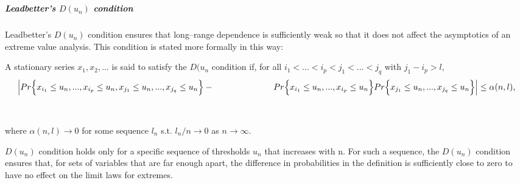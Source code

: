 \documentclass[usenames,dvipsnames]{beamer}
\begin{document}
\part{}
\begin{frame}[noframenumbering]
\frametitle{Leadbetter’s $D(u_{n})$ condition}
\scriptsize
Leadbetter’s $D(u_{n})$ condition ensures that long–range dependence is sufficiently weak so that it does not affect the asymptotics
of an extreme value analysis. This condition is stated more formally in this way:
\begin{definition}
A stationary series $x_{1}, x_{2}, ...$ is said to satisfy the $D(u_{n}$ condition if, for all $i_{1}<...< i_{p}<j_{1}<...<j_{q}$ with $j_{1}-i_{p}>l$, 
\begin{equation*}
    \Big|Pr\Big\{ x_{i_{1}}\leq u_{n},...,x_{i_{p}}\leq u_{n},x_{j_{1}}\leq u_{n},...,x_{j_{q}}\leq u_{n}\Big\}-
    \\
    \hspace{70pt} Pr\Big\{ x_{i_{1}}\leq u_{n},...,x_{i_{p}}\leq u_{n}\Big\}Pr\Big\{x_{j_{1}}\leq u_{n},...,x_{j_{q}}\leq u_{n}\Big\}\Big|\leq \alpha(n,l),
\end{equation*} \\
\\


where $\alpha(n,l) \rightarrow 0$ for some sequence $l_{n}$ s.t. $l_{n}/n \rightarrow 0$ as $n \rightarrow \infty$.
\end{definition}
$D(u_{n})$ condition holds only for a specific sequence of thresholds $u_{n}$ that increases with n. For such a sequence, the $D(u_{n})$ condition ensures that, for sets of variables that are far enough apart, the difference in probabilities in the definition is sufficiently close to zero to have no effect on the limit laws for extremes.
\end{frame}
\end{document}
